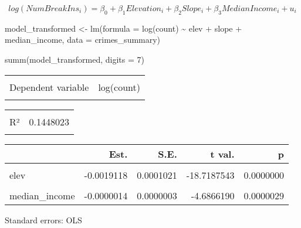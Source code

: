 \documentclass[
]{article}
\newenvironment{Shaded}{\begin{snugshade}}{\end{snugshade}}
\newcommand{\AttributeTok}[1]{\textcolor[rgb]{0.77,0.63,0.00}{#1}}
\newcommand{\DecValTok}[1]{\textcolor[rgb]{0.00,0.00,0.81}{#1}}
\newcommand{\FunctionTok}[1]{\textcolor[rgb]{0.00,0.00,0.00}{#1}}
\newcommand{\NormalTok}[1]{#1}
\newcommand{\OtherTok}[1]{\textcolor[rgb]{0.56,0.35,0.01}{#1}}
\newcommand{\SpecialCharTok}[1]{\textcolor[rgb]{0.00,0.00,0.00}{#1}}
\begin{document}
\[log(NumBreakIns_i) = \beta_0 + \beta_1Elevation_i + \beta_2Slope_i + \beta_3MedianIncome_i + u_i\]

\begin{Shaded}
\begin{Highlighting}[]
\NormalTok{model\_transformed }\OtherTok{\textless{}{-}} \FunctionTok{lm}\NormalTok{(}\AttributeTok{formula =} \FunctionTok{log}\NormalTok{(count) }\SpecialCharTok{\textasciitilde{}}\NormalTok{ elev }\SpecialCharTok{+}\NormalTok{ slope }\SpecialCharTok{+}\NormalTok{ median\_income, }\AttributeTok{data =}\NormalTok{ crimes\_summary)}

\FunctionTok{summ}\NormalTok{(model\_transformed, }\AttributeTok{digits =} \DecValTok{7}\NormalTok{)}
\end{Highlighting}
\end{Shaded}

\begin{table}[!h]
\centering
\begin{tabular}{lr}
\toprule
\cellcolor{gray!6}{Observations} & \cellcolor{gray!6}{4391 (23 missing obs. deleted)}\\
Dependent variable & log(count)\\
\cellcolor{gray!6}{Type} & \cellcolor{gray!6}{OLS linear regression}\\
\bottomrule
\end{tabular}
\end{table} \begin{table}[!h]
\centering
\begin{tabular}{lr}
\toprule
\cellcolor{gray!6}{F(3,4387)} & \cellcolor{gray!6}{247.6027651}\\
R² & 0.1448023\\
\cellcolor{gray!6}{Adj. R²} & \cellcolor{gray!6}{0.1442175}\\
\bottomrule
\end{tabular}
\end{table} \begin{table}[!h]
\centering
\begin{threeparttable}
\begin{tabular}{lrrrr}
\toprule
  & Est. & S.E. & t val. & p\\
\midrule
\cellcolor{gray!6}{(Intercept)} & \cellcolor{gray!6}{1.8826251} & \cellcolor{gray!6}{0.0391027} & \cellcolor{gray!6}{48.1456352} & \cellcolor{gray!6}{0.0000000}\\
elev & -0.0019118 & 0.0001021 & -18.7187543 & 0.0000000\\
\cellcolor{gray!6}{slope} & \cellcolor{gray!6}{-0.0211530} & \cellcolor{gray!6}{0.0023258} & \cellcolor{gray!6}{-9.0948218} & \cellcolor{gray!6}{0.0000000}\\
median\_income & -0.0000014 & 0.0000003 & -4.6866190 & 0.0000029\\
\bottomrule
\end{tabular}
\begin{tablenotes}
\item Standard errors: OLS
\end{tablenotes}
\end{threeparttable}
\end{table}
\end{document}

